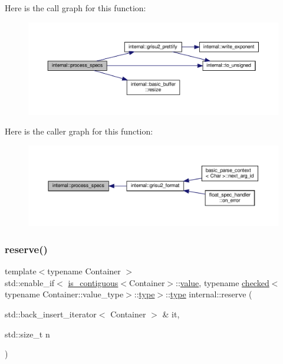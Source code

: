 Here is the call graph for this function\+:
\nopagebreak
\begin{figure}[H]
\begin{center}
\leavevmode
\includegraphics[width=350pt]{namespaceinternal_ae7e379764ed4a98f3058130ffbca218a_cgraph}
\end{center}
\end{figure}
Here is the caller graph for this function\+:
\nopagebreak
\begin{figure}[H]
\begin{center}
\leavevmode
\includegraphics[width=350pt]{namespaceinternal_ae7e379764ed4a98f3058130ffbca218a_icgraph}
\end{center}
\end{figure}
\mbox{\label{namespaceinternal_ac4b0a3ecf8e30e217ef1dacb83170118}} 
\subsubsection{\texorpdfstring{reserve()}{reserve()}\hspace{0.1cm}{\footnotesize\ttfamily [1/2]}}
{\footnotesize\ttfamily template$<$typename Container $>$ \\
std\+::enable\+\_\+if$<$ \hyperlink{structis__contiguous}{is\+\_\+contiguous}$<$Container$>$\+::\hyperlink{classinternal_1_1value}{value}, typename \hyperlink{structinternal_1_1checked}{checked}$<$typename Container\+::value\+\_\+type$>$\+::\hyperlink{namespaceinternal_a8661864098ac0acff9a6dd7e66f59038}{type}$>$\+::\hyperlink{namespaceinternal_a8661864098ac0acff9a6dd7e66f59038}{type} internal\+::reserve (\begin{DoxyParamCaption}\item[{std\+::back\+\_\+insert\+\_\+iterator$<$ Container $>$ \&}]{it,  }\item[{std\+::size\+\_\+t}]{n }\end{DoxyParamCaption})\hspace{0.3cm}{\ttfamily [inline]}}



